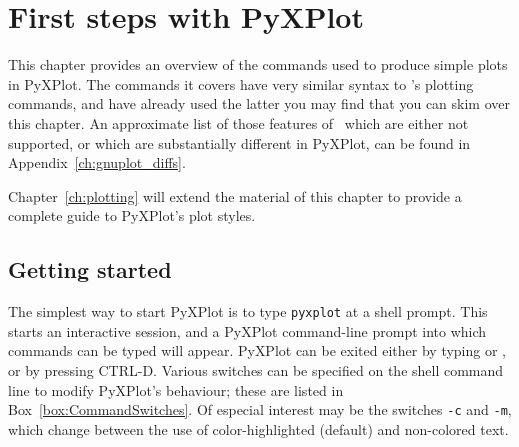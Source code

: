 %
%
%
%
%



\chapter{First steps with PyXPlot}
\label{ch:first_steps}

This chapter provides an overview of the commands used to produce simple plots
in PyXPlot. The commands it covers have very similar syntax to \gnuplot's
plotting commands, and have already used the latter you may find that you can
skim over this chapter. An approximate list of those features of \gnuplot\
which are either not supported, or which are substantially different in
PyXPlot, can be found in Appendix~\ref{ch:gnuplot_diffs}.

Chapter~\ref{ch:plotting} will extend the material of this chapter to provide a
complete guide to PyXPlot's plot styles.

\section{Getting started}

The simplest way to start PyXPlot is to type {\tt pyxplot} at a shell prompt.
This starts an interactive session, and a PyXPlot command-line prompt into
which commands can be typed will appear. PyXPlot can be exited either by typing
\indcmdts{exit} or \indcmdts{quit}, or by pressing CTRL-D. Various switches can
be specified on the shell command line to modify PyXPlot's behaviour; these are
listed in Box~\ref{box:CommandSwitches}.  Of especial interest may be the
switches {\tt -c} and {\tt -m}, which change between the use of
color-highlighted (default) and non-colored text.

